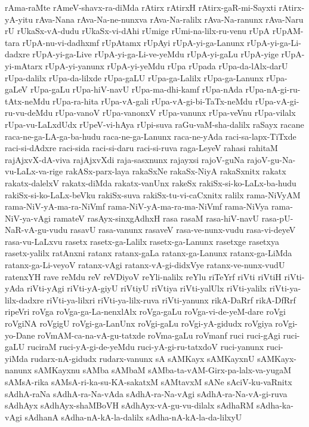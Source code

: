 {rAma-raMte
rAmeV-shavx-ra-diMda
rAtirx
rAtirxH
rAtirx-gaR-mi-Sayxti
rAtirx-yA-yitu
rAva-Nana
rAva-Na-ne-nunxva
rAva-Na-ralilx
rAva-Na-ranunx
rAva-Naru
rU
rUkaSx-vA-dudu
rUkaSx-vi-dAhi
rUmige
rUmi-na-lilx-ru-venu
rUpA
rUpAM-tara
rUpA-nu-vi-dadhxmf
rUpAtamx
rUpAyi
rUpA-yi-ga-Lanunx
rUpA-yi-ga-Li-dadxre
rUpA-yi-ga-Live
rUpA-yi-ga-Li-ve-yeMdu
rUpA-yi-gaLu
rUpA-yige
rUpA-yi-mAtarx
rUpA-yi-yanunx
rUpA-yi-yeMdu
rUpa
rUpada
rUpa-da-lAlx-darU
rUpa-dalilx
rUpa-da-lilxde
rUpa-gaLU
rUpa-ga-Lalilx
rUpa-ga-Lanunx
rUpa-gaLeV
rUpa-gaLu
rUpa-hiV-navU
rUpa-ma-dhi-kamf
rUpa-nAda
rUpa-nA-gi-ru-tAtx-neMdu
rUpa-ra-hita
rUpa-vA-gali
rUpa-vA-gi-bi-TaTx-neMdu
rUpa-vA-gi-ru-vu-deMdu
rUpa-vanoV
rUpa-vanonxV
rUpa-vanunx
rUpa-veVnu
rUpa-vilalx
rUpa-vu-LaLxdUdx
rUpeV-vi-hAya
rUpi-suva
raGu-vaM-sha-dalilx
raSayx
racane
raca-ne-ga-LA-ga-ba-hudu
raca-ne-ga-Lanunx
raca-ne-yAda
raci-sa-lapx-TiTxde
raci-si-dAdxre
raci-sida
raci-si-daru
raci-si-ruva
raga-LeyeV
rahasi
rahitaM
rajAjxvX-dA-viva
rajAjxvXdi
raja-sasxnunx
rajayxsi
rajoV-guNa
rajoV-gu-Na-vu-LaLx-va-rige
rakASx-parx-laya
rakaSxNe
rakaSx-NiyA
rakaSxnitx
rakatx
rakatx-dalelxV
rakatx-diMda
rakatx-vanUnx
rakeSx
rakiSx-si-ko-LaLx-ba-hudu
rakiSx-si-ko-LaLx-beVku
rakiSx-suva
rakiSx-tu-vi-caCxnitx
ralilx
rama-NiVyAM
rama-NiV-yA-ma-ra-NiVmf
rama-NiV-yA-ma-ra-ma-NiVmf
rama-NiVya
rama-NiV-ya-vAgi
ramateV
rasAyx-sinxgAdhxH
rasa
rasaM
rasa-hiV-navU
rasa-pU-NaR-vA-gu-vudu
rasavU
rasa-vanunx
rasaveV
rasa-ve-nunx-vudu
rasa-vi-deyeV
rasa-vu-LaLxvu
rasetx
rasetx-ga-Lalilx
rasetx-ga-Lanunx
rasetxge
rasetxya
rasetx-yalilx
ratAnxni
ratanx
ratanx-gaLa
ratanx-ga-Lanunx
ratanx-ga-LiMda
ratanx-ga-Li-veyoV
ratanx-vAgi
ratanx-vA-gi-didxVye
ratanx-ve-nunx-vudU
ratenxYH
rave
reMdu
reV
reVDiyoV
reYli-nalilx
reYlu
riTeYrf
riVti
riVtiH
riVti-yAda
riVti-yAgi
riVti-yA-giyU
riVtiyU
riVtiya
riVti-yalUlx
riVti-yalilx
riVti-ya-lilx-dadxre
riVti-ya-lilxri
riVti-ya-lilx-ruva
riVti-yanunx
rikA-DaRrf
rikA-DfRrf
ripeVri
roVga
roVga-ga-La-nenxlAlx
roVga-gaLu
roVga-vi-de-yeM-dare
roVgi
roVgiNA
roVgigU
roVgi-ga-LanUnx
roVgi-gaLu
roVgi-yA-gidudx
roVgiya
roVgi-yo-Dane
roVmAM-ca-na-vA-gu-tatxde
roVma-gaLu
roVmanf
ruci
ruci-gAgi
ruci-gaLU
ruciraM
ruci-yA-gi-de-yeMdu
ruci-yA-gi-ru-tatxdoV
ruci-yanunx
ruci-yiMda
rudarx-nA-gidudx
rudarx-vanunx
sA
sAMKayx
sAMKayxnU
sAMKayx-nanunx
sAMKayxnu
sAMba
sAMbaM
sAMba-ta-vAM-Girx-pa-lalx-va-yugaM
sAMsA-rika
sAMsA-ri-ka-su-KA-sakatxM
sAMtavxM
sANe
sAciV-ku-vaRnitx
sAdhA-raNa
sAdhA-ra-Na-vAda
sAdhA-ra-Na-vAgi
sAdhA-ra-Na-vA-gi-ruva
sAdhAyx
sAdhAyx-shaMBoVH
sAdhAyx-vA-gu-vu-dilalx
sAdhaRM
sAdha-ka-vAgi
sAdhanA
sAdha-nA-kA-la-dalilx
sAdha-nA-kA-la-da-lilxyU
}
